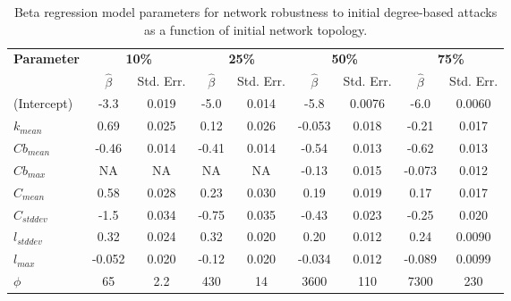 \begin{table}[!htp]
\scriptsize
\centering

\begin{tabular}{lcccccccc}
\toprule
\multirow{2}{*}{\textbf{Parameter}} & \multicolumn{2}{c}{\textbf{10\%}} & \multicolumn{2}{c}{\textbf{25\%}} & \multicolumn{2}{c}{\textbf{50\%}} & \multicolumn{2}{c}{\textbf{75\%}}\\
 & $\hat{\beta}$ & Std. Err. & $\hat{\beta}$ & Std. Err. & $\hat{\beta}$ & Std. Err. & $\hat{\beta}$ & Std. Err. \\
\midrule

(Intercept) & -3.3 & 0.019 & -5.0 & 0.014 & -5.8 & 0.0076 & -6.0 & 0.0060 \\
$k_{mean}$ & 0.69 & 0.025 & 0.12 & 0.026 & -0.053 & 0.018 & -0.21 & 0.017 \\
$Cb_{mean}$ & -0.46 & 0.014 & -0.41 & 0.014 & -0.54 & 0.013 & -0.62 & 0.013 \\
$Cb_{max}$ & NA & NA & NA & NA & -0.13 & 0.015 & -0.073 & 0.012 \\
$C_{mean}$ & 0.58 & 0.028 & 0.23 & 0.030 & 0.19 & 0.019 & 0.17 & 0.017 \\
$C_{std dev}$ & -1.5 & 0.034 & -0.75 & 0.035 & -0.43 & 0.023 & -0.25 & 0.020 \\
$l_{std dev}$ & 0.32 & 0.024 & 0.32 & 0.020 & 0.20 & 0.012 & 0.24 & 0.0090 \\
$l_{max}$ & -0.052 & 0.020 & -0.12 & 0.020 & -0.034 & 0.012 & -0.089 & 0.0099 \\
$\phi$ & 65 & 2.2 & 430 & 14 & 3600 & 110 & 7300 & 230 \\

\bottomrule

\end{tabular}

\caption[Beta regression model parameters for network robustness to initial degree-based attacks.]{\label{tab:ch2:betaregNDi}Beta regression model parameters for network robustness to initial degree-based attacks as a function of initial network topology.}
\end{table}




